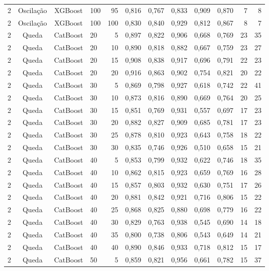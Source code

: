 \begin{longtable}{ccclrrrrrrrr}
2 & Oscilação & XGBoost & 100 & 95 & 0,816 & 0,767 & 0,833 & 0,909 & 0,870 & 7 & 8 \\
2 & Oscilação & XGBoost & 100 & 100 & 0,830 & 0,840 & 0,929 & 0,812 & 0,867 & 8 & 7 \\
2 & Queda & CatBoost & 20 & 5 & 0,897 & 0,822 & 0,906 & 0,668 & 0,769 & 23 & 35 \\
2 & Queda & CatBoost & 20 & 10 & 0,890 & 0,818 & 0,882 & 0,667 & 0,759 & 23 & 27 \\
2 & Queda & CatBoost & 20 & 15 & 0,908 & 0,838 & 0,917 & 0,696 & 0,791 & 22 & 23 \\
2 & Queda & CatBoost & 20 & 20 & 0,916 & 0,863 & 0,902 & 0,754 & 0,821 & 20 & 22 \\
2 & Queda & CatBoost & 30 & 5 & 0,869 & 0,798 & 0,927 & 0,618 & 0,742 & 22 & 41 \\
2 & Queda & CatBoost & 30 & 10 & 0,873 & 0,816 & 0,890 & 0,669 & 0,764 & 20 & 25 \\
2 & Queda & CatBoost & 30 & 15 & 0,851 & 0,769 & 0,931 & 0,557 & 0,697 & 17 & 23 \\
2 & Queda & CatBoost & 30 & 20 & 0,882 & 0,827 & 0,909 & 0,685 & 0,781 & 17 & 23 \\
2 & Queda & CatBoost & 30 & 25 & 0,878 & 0,810 & 0,923 & 0,643 & 0,758 & 18 & 22 \\
2 & Queda & CatBoost & 30 & 30 & 0,835 & 0,746 & 0,926 & 0,510 & 0,658 & 15 & 21 \\
2 & Queda & CatBoost & 40 & 5 & 0,853 & 0,799 & 0,932 & 0,622 & 0,746 & 18 & 35 \\
2 & Queda & CatBoost & 40 & 10 & 0,862 & 0,815 & 0,923 & 0,659 & 0,769 & 16 & 28 \\
2 & Queda & CatBoost & 40 & 15 & 0,857 & 0,803 & 0,932 & 0,630 & 0,751 & 17 & 26 \\
2 & Queda & CatBoost & 40 & 20 & 0,881 & 0,842 & 0,921 & 0,716 & 0,806 & 15 & 22 \\
2 & Queda & CatBoost & 40 & 25 & 0,868 & 0,825 & 0,880 & 0,698 & 0,779 & 16 & 22 \\
2 & Queda & CatBoost & 40 & 30 & 0,829 & 0,763 & 0,938 & 0,545 & 0,690 & 14 & 18 \\
2 & Queda & CatBoost & 40 & 35 & 0,800 & 0,738 & 0,806 & 0,543 & 0,649 & 14 & 21 \\
2 & Queda & CatBoost & 40 & 40 & 0,890 & 0,846 & 0,933 & 0,718 & 0,812 & 15 & 17 \\
2 & Queda & CatBoost & 50 & 5 & 0,859 & 0,821 & 0,956 & 0,661 & 0,782 & 15 & 37 \\

\end{longtable}

